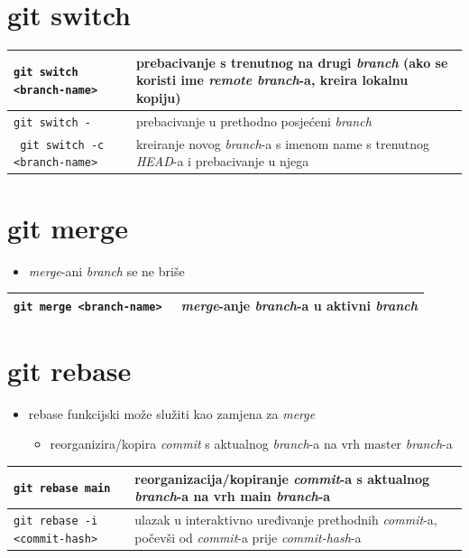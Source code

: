 \documentclass[10pt]{article}
\begin{document}
    \section*{\color{BrickRed} git switch}
    \begin{tabular}{|>{\tt}p{9.25cm}|>{}p{15.50cm}|}
        \hline
        git switch <branch-name>                        & prebacivanje s trenutnog na drugi \textit{branch} (ako se koristi ime \textit{remote branch}-a, kreira lokalnu kopiju) \\ \hline
        git switch -                                    & prebacivanje u prethodno posjećeni \textit{branch} \\ \hline
        git switch -c <branch-name>                     & kreiranje novog \textit{branch}-a s imenom name s trenutnog \textit{HEAD}-a i prebacivanje u njega \\ \hline
    \end{tabular}

    \section*{\color{BrickRed} git merge}
    \begin{itemize}
        \item \textit{merge}-ani \textit{branch} se ne briše
    \end{itemize}
    \begin{tabular}{|>{\tt}p{9.25cm}|>{}p{15.50cm}|}
        \hline
        git merge <branch-name>                         & \textit{merge}-anje \textit{branch}-a u aktivni \textit{branch} \\ \hline
    \end{tabular}

    \section*{\color{BrickRed} git rebase}
    \begin{itemize}
        \item rebase funkcijski može služiti kao zamjena za \textit{merge}
        \begin{itemize}
            \item reorganizira/kopira \textit{commit} s aktualnog \textit{branch}-a na vrh master \textit{branch}-a
        \end{itemize}
    \end{itemize}
    \begin{tabular}{|>{\tt}p{9.25cm}|>{}p{15.50cm}|}
        \hline
        git rebase main                                 & reorganizacija/kopiranje \textit{commit}-a s aktualnog \textit{branch}-a na vrh main \textit{branch}-a \\ \hline
        git rebase -i <commit-hash>                     & ulazak u interaktivno uređivanje prethodnih \textit{commit}-a, počevši od \textit{commit}-a prije \textit{commit-hash}-a \\ \hline
    \end{tabular}
\end{document}
